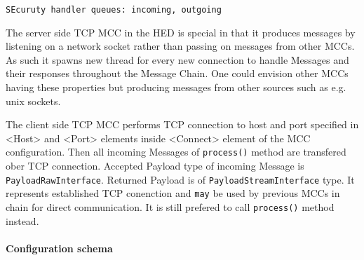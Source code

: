 \documentclass{book}
\begin{document}
\texttt{SEcuruty handler queues: incoming, outgoing}


The server side TCP MCC in the HED is special in that it produces messages by listening on a network socket rather than passing on messages from other MCCs. As such it spawns new thread for every new connection to handle Messages and their responses throughout the Message Chain. One could envision other MCCs having these properties but producing messages from other sources such as e.g. unix sockets.



The client side TCP MCC performs TCP connection to host and port specified in <Host> and <Port> elements inside <Connect> element of the MCC configuration. Then all incoming Messages of \texttt{process()} method are transfered ober TCP connection. Accepted Payload type of incoming Message is \texttt{PayloadRawInterface}. Returned Payload is of \texttt{PayloadStreamInterface} type. It represents established TCP conenction and \texttt{may} be used by previous MCCs in chain for direct communication. It is still prefered to call \texttt{process()} method instead.

\paragraph{Configuration schema}
\end{document}
